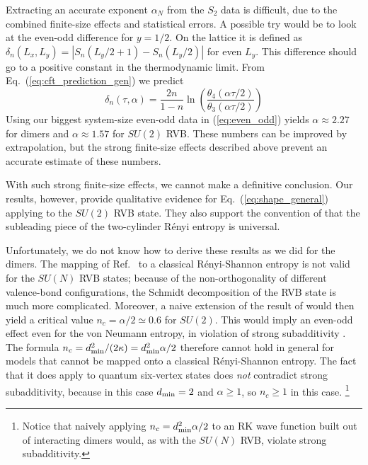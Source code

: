 \documentclass[11pt]{iopart}
\begin{document}
Extracting an accurate exponent $\alpha_N$ from the $S_2$ data is difficult, due to the combined finite-size effects and statistical errors. A possible try would be to  look at the even-odd difference for $y=1/2$. On the lattice it is defined as $\delta_n(L_x,L_y)=\left|S_n(L_y/2+1)-S_n(L_y/2)\right|$ for even $L_y$. This difference should go to a positive constant in the thermodynamic limit. From Eq.~(\ref{eq:cft_prediction_gen}) we predict
\begin{equation}\label{eq:even_odd}
 \delta_n(\tau,\alpha)=\frac{2n}{1-n}\ln \left(\frac{\theta_4(\alpha\tau/2)}{\theta_3(\alpha \tau/2)}\right)
\end{equation}
Using our biggest system-size even-odd data in (\ref{eq:even_odd}) yields $\alpha \approx 2.27$ for dimers and $\alpha \approx 1.57$ for $SU(2)$ RVB. These numbers can be improved by extrapolation, but the strong finite-size effects described above prevent an accurate estimate of these numbers.


With such strong finite-size effects, we cannot make a definitive conclusion. Our results, however, provide qualitative evidence for  Eq.~(\ref{eq:shape_general}) applying to the $SU(2)$ RVB state. They also support the convention of \cite{Ju2012} that the subleading piece of the two-cylinder R\'enyi entropy is universal.


Unfortunately, we do not know how to derive these results as we did for the dimers. The mapping of Ref.~\cite{Shannonee} to a classical R\'enyi-Shannon entropy is not valid for the $SU(N)$ RVB states; because of the non-orthogonality of different valence-bond configurations, the Schmidt decomposition of the RVB state is much more complicated.  Moreover, a naive extension of the result of \cite{Stephan2011} would then yield a critical value $ n_c=\alpha/2\simeq 0.6$  for $SU(2)$. This would imply an even-odd effect even for the von Neumann entropy, in violation of strong subadditivity \cite{Strongsubadditivity}. The formula $n_c=d_{\rm min }^2/(2\kappa)=d_{\rm min}^2\alpha/2$ therefore cannot hold in general for models that cannot be mapped onto a classical R\'enyi-Shannon entropy. The fact that it does apply to quantum six-vertex states does \emph{not} 
contradict strong subadditivity, because in this case $d_{\rm min}=2$ and $\alpha \geq 1$, so $n_c\geq 1$ in this case. \footnote{Notice that naively  applying $n_c=d_{\rm min}^2 \alpha/2$ to an RK wave function built out of interacting dimers \cite{Alet_dimers1,Alet_dimers2} would, as with the $SU(N)$ RVB, violate strong subadditivity.} 
\end{document}

